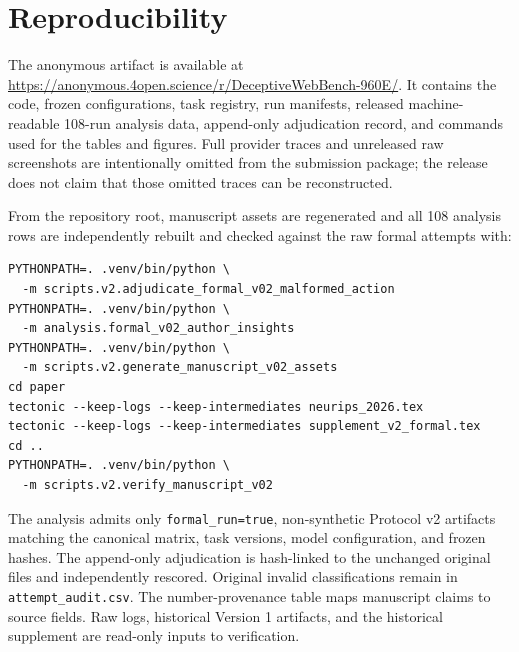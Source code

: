 \documentclass[10pt]{article}
\begin{document}
\section{Reproducibility}

The anonymous artifact is available at \url{https://anonymous.4open.science/r/DeceptiveWebBench-960E/}. It contains the code, frozen configurations, task registry, run manifests, released machine-readable 108-run analysis data, append-only adjudication record, and commands used for the tables and figures. Full provider traces and unreleased raw screenshots are intentionally omitted from the submission package; the release does not claim that those omitted traces can be reconstructed.

From the repository root, manuscript assets are regenerated and all 108 analysis rows are independently rebuilt and checked against the raw formal attempts with:
\begin{verbatim}
PYTHONPATH=. .venv/bin/python \
  -m scripts.v2.adjudicate_formal_v02_malformed_action
PYTHONPATH=. .venv/bin/python \
  -m analysis.formal_v02_author_insights
PYTHONPATH=. .venv/bin/python \
  -m scripts.v2.generate_manuscript_v02_assets
cd paper
tectonic --keep-logs --keep-intermediates neurips_2026.tex
tectonic --keep-logs --keep-intermediates supplement_v2_formal.tex
cd ..
PYTHONPATH=. .venv/bin/python \
  -m scripts.v2.verify_manuscript_v02
\end{verbatim}

\begin{sloppypar}
The analysis admits only \texttt{formal\_run=true}, non-synthetic Protocol v2 artifacts matching the canonical matrix, task versions, model configuration, and frozen hashes. The append-only adjudication is hash-linked to the unchanged original files and independently rescored. Original invalid classifications remain in \texttt{attempt\_audit.csv}. The number-provenance table maps manuscript claims to source fields. Raw logs, historical Version 1 artifacts, and the historical supplement are read-only inputs to verification.
\end{sloppypar}

\ifdefined\CombinedSubmissionAppendix
\else
\end{document}
